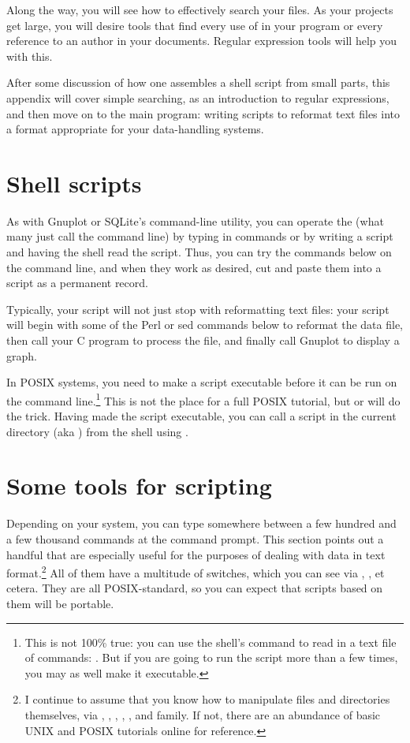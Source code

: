 Along the way, you will see how to effectively search your files. As
your projects get large, you will desire tools that find every use of
 in your program or every reference to an author in
your documents. Regular expression tools will help you with this.

After some discussion of how one assembles a shell script from small
parts, this appendix will cover simple searching, as an introduction to
regular expressions, and then move on to the main program: writing
scripts to reformat text files into a format appropriate for your
data-handling systems.

\section{Shell scripts} As with Gnuplot or SQLite's command-line
utility, you can operate the  (what many just call the command line)
by typing in commands or by writing a script and having the shell read
the script. Thus, you can try the commands below on the command line,
and when they work as desired, cut and paste them into a script as a permanent
record. 

Typically, your script will not just stop with reformatting text files:
your script will begin with some of the Perl or sed commands below to
reformat the data file, then call your C program to process the file, and
finally call Gnuplot to display a graph. 

In POSIX systems, you need to make a script executable before it can be
run on the command line.\footnote{This is not 100\% true: you can use
the shell's  command to read in a text file of commands:
. But if you are going to run the script more than a
few times, you may as well make it executable.} This is not the place
for a full POSIX tutorial, but  or  will do the trick. Having made the script executable, you
can call a script in the current directory (aka ) from the shell
using .

\section{Some tools for scripting}
Depending on your system, you can type somewhere between a few hundred
and a few thousand commands at the command prompt. This section points
out a handful that are especially useful for the purposes of dealing
with data in text format.\footnote{I continue to assume that you know
how to manipulate files and directories themselves, via ,
, , , , and family. If not, there are
an abundance of basic UNIX and POSIX tutorials online for reference.}
All of them have a multitude of switches, which you can see via ,  , et cetera. They are all POSIX-standard, so you
can expect that scripts based on them will be portable.

